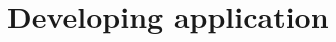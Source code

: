 \documentclass[twoside, 12pt, a4paper]{refart}
\begin{document}



\newpage
\section{Developing application}


\printindex
\end{document}
